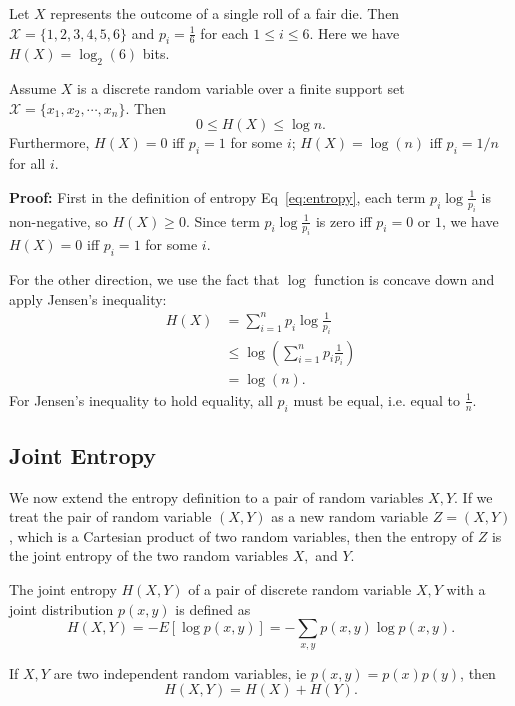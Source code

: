 \begin{example}
Let \(X\) represents the outcome of a single roll of a fair die. Then \(\mathcal{X} = \{1, 2, 3, 4, 5, 6\}\) and \(p_i = \frac{1}{6}\) for each \(1\leq i \leq 6\). Here we have \(H(X)= \log_{2}(6)\) bits.
\end{example}

\begin{theorem}
Assume \(X\) is a discrete random variable over a finite support set \(\mathcal{X} = \{x_1, x_2, \cdots, x_n\}\). Then 
\[ 0 \leq H(X) \leq \log n.\]
Furthermore, \(H(X)=0\) iff \(p_i=1\) for some \(i\); \(H(X)=\log (n)\) iff \(p_i = 1/n\) for all \(i\).
\end{theorem}

\textbf{Proof:} First in the definition of entropy Eq~\ref{eq:entropy}, each term \(p_i \log \frac{1}{p_i}\) is non-negative, so \(H(X) \geq 0\). Since term \(p_i \log \frac{1}{p_i}\) is zero iff \(p_i = 0\) or \(1\), we have \(H(X)=0\) iff \(p_i=1\) for some \(i\).

For the other direction, we use the fact that \(\log\) function is concave down and apply Jensen's inequality:
\begin{align*}
    H(X) &= \sum_{i=1}^{n} p_i \log \frac{1}{p_i} \\
        &\leq \log (\sum_{i=1}^{n}p_i \frac{1}{p_i}) \\
        &= \log(n).
\end{align*}
For Jensen's inequality to hold equality, all \(p_i\) must be equal, i.e. equal to \(\frac{1}{n}\).

\subsection{Joint Entropy}
We now extend the entropy definition to a pair of random variables \(X, Y\). If we treat the pair of random variable \((X,Y)\) as a new random variable \(Z=(X,Y)\), which is a Cartesian product of two random variables, then the entropy of \(Z\) is the joint entropy of the two random variables \(X,\) and \(Y\).

\begin{definition}
    The joint entropy \(H(X,Y)\) of a pair of discrete random variable \(X,Y\) with a joint distribution \(p(x,y)\) is defined as 
    \[ H(X,Y) = -E[\log p(x,y)] = -\sum_{x,y} p(x,y) \log p(x, y).\]
\end{definition}

\begin{theorem}
If \(X, Y\) are two independent random variables, ie \(p(x,y) = p(x)p(y)\), then 
\[H(X,Y) = H(X) + H(Y).\]
\end{theorem}

